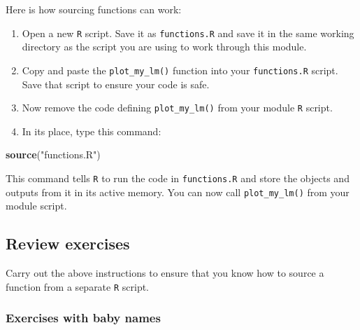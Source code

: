 \documentclass[]{book}
\newenvironment{Shaded}{\begin{snugshade}}{\end{snugshade}}
\newcommand{\KeywordTok}[1]{\textcolor[rgb]{0.13,0.29,0.53}{\textbf{#1}}}
\newcommand{\NormalTok}[1]{#1}
\newcommand{\StringTok}[1]{\textcolor[rgb]{0.31,0.60,0.02}{#1}}
\begin{document}
Here is how sourcing functions can work:

\begin{enumerate}
\def\labelenumi{\arabic{enumi}.}
\item
  Open a new \texttt{R} script. Save it as \texttt{functions.R} and save it in the same working directory as the script you are using to work through this module.
\item
  Copy and paste the \texttt{plot\_my\_lm()} function into your \texttt{functions.R} script. Save that script to ensure your code is safe.
\item
  Now remove the code defining \texttt{plot\_my\_lm()} from your module \texttt{R} script.
\item
  In its place, type this command:
\end{enumerate}

\begin{Shaded}
\begin{Highlighting}[]
\KeywordTok{source}\NormalTok{(}\StringTok{"functions.R"}\NormalTok{)}
\end{Highlighting}
\end{Shaded}

This command tells \texttt{R} to run the code in \texttt{functions.R} and store the objects and outputs from it in its active memory. You can now call \texttt{plot\_my\_lm()} from your module script.

\hypertarget{review-exercises}{%
\subsection*{Review exercises}\label{review-exercises}}

Carry out the above instructions to ensure that you know how to source a function from a separate \texttt{R} script.

\hypertarget{exercises-with-baby-names}{%
\subsubsection*{Exercises with baby names}\label{exercises-with-baby-names}}
\end{document}
